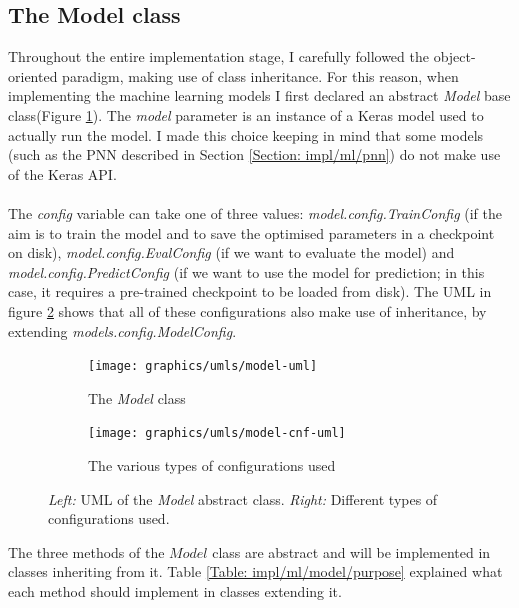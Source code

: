 	\subsection{The Model class} \label{Section: impl/ml/structure}
	Throughout the entire implementation stage, I carefully followed the object-oriented paradigm, making use of class inheritance. For this reason, when implementing the machine learning models I first declared an abstract \textit{Model} base class(Figure \ref{Fig: impl/ml/model/uml/model}). The \textit{model} parameter is an instance of a Keras model used to actually run the model. I made this choice keeping in mind that some models (such as the PNN described in Section \ref{Section: impl/ml/pnn}) do not make use of the Keras API. \\ \\
	The \textit{config} variable can take one of three values: \textit{model.config.TrainConfig} (if the aim is to train the model and to save the optimised parameters in a checkpoint on disk), \textit{model.config.EvalConfig} (if we want to evaluate the model) and \textit{model.config.PredictConfig} (if we want to use the model for prediction; in this case, it requires a pre-trained checkpoint to be loaded from disk). The UML in figure \ref{Fig: impl/ml/model/uml/configs} shows that all of these configurations also make use of inheritance, by extending \textit{models.config.ModelConfig}.
	\begin{figure}[H]
		\centering
		\begin{subfigure}[b]{.3\textwidth}
			\texttt{[image: graphics/umls/model-uml]}
			\caption{The \textit{Model} class}
			\label{Fig: impl/ml/model/uml/model}
			\hspace{1pt}
		\end{subfigure}\hfill
		\begin{subfigure}[b]{.55\textwidth}
			\texttt{[image: graphics/umls/model-cnf-uml]}
			\caption{The various types of configurations used}
			\label{Fig: impl/ml/model/uml/configs}
		\end{subfigure}
		\caption{\textit{Left:} UML of the \textit{Model} abstract class. \textit{Right:} Different types of configurations used.}
		\label{Fig: impl/ml/model/uml}
	\end{figure}
	The three methods of the $Model$ class are abstract and will be implemented in classes inheriting from it. Table \ref{Table: impl/ml/model/purpose} explained what each method should implement in classes extending it.
